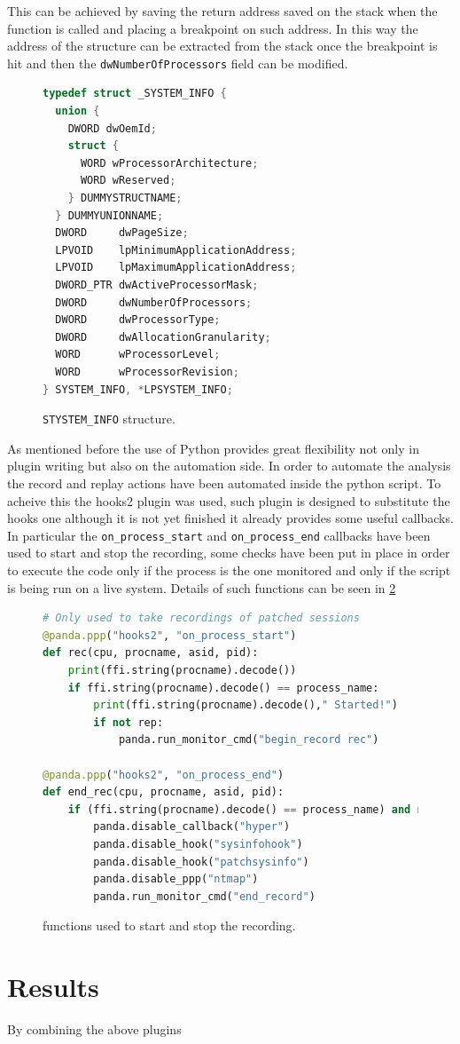 This can be achieved by saving the return address saved on the stack when the function is called and placing a breakpoint on such address. In this way the address of the structure can be extracted from the stack once the breakpoint is hit and then the \lstinline{dwNumberOfProcessors} field can be modified.  

\begin{figure}[htp]
\centering
\begin{lstlisting}[language=C++] 
typedef struct _SYSTEM_INFO {
  union {
    DWORD dwOemId;
    struct {
      WORD wProcessorArchitecture;
      WORD wReserved;
    } DUMMYSTRUCTNAME;
  } DUMMYUNIONNAME;
  DWORD     dwPageSize;
  LPVOID    lpMinimumApplicationAddress;
  LPVOID    lpMaximumApplicationAddress;
  DWORD_PTR dwActiveProcessorMask;
  DWORD     dwNumberOfProcessors;
  DWORD     dwProcessorType;
  DWORD     dwAllocationGranularity;
  WORD      wProcessorLevel;
  WORD      wProcessorRevision;
} SYSTEM_INFO, *LPSYSTEM_INFO;
\end{lstlisting}
\caption{\lstinline{STYSTEM_INFO} structure.}
\label{fig:sysinfo}
\end{figure}

As mentioned before the use of Python provides great flexibility not only in plugin writing but also on the automation side. In order to automate the analysis the record and replay actions have been automated inside the python script. To acheive this the hooks2 plugin was used, such plugin is designed to substitute the hooks one although it is not yet finished it already provides some useful callbacks. In particular the \lstinline{on_process_start} and \lstinline{on_process_end} callbacks have been used to start and stop the recording, some checks have been put in place in order to execute the code only if the process is the one monitored and only if the script is being run on a live system. Details of such functions can be seen in \ref{fig:startstop}

\begin{figure}[htp]
\centering
\begin{lstlisting}[language=Python] 
# Only used to take recordings of patched sessions
@panda.ppp("hooks2", "on_process_start")
def rec(cpu, procname, asid, pid):
    print(ffi.string(procname).decode())
    if ffi.string(procname).decode() == process_name:
        print(ffi.string(procname).decode()," Started!")
        if not rep:
            panda.run_monitor_cmd("begin_record rec")

@panda.ppp("hooks2", "on_process_end")
def end_rec(cpu, procname, asid, pid):
    if (ffi.string(procname).decode() == process_name) and not rep:
        panda.disable_callback("hyper")
        panda.disable_hook("sysinfohook")
        panda.disable_hook("patchsysinfo")
        panda.disable_ppp("ntmap")
        panda.run_monitor_cmd("end_record")
\end{lstlisting}
\caption{functions used to start and stop the recording.}
\label{fig:startstop}
\end{figure}

\section{Results}

By combining the above plugins 